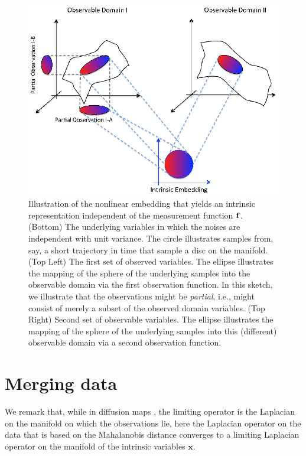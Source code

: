 \begin{figure}[t]
\centering
\includegraphics[width=5in]{fig1}
\caption[Illustration of the nonlinear embedding that yields an intrinsic representation independent of the measurement function]{Illustration of the nonlinear embedding that yields an intrinsic representation independent of the measurement function $\mathbf{f}$. (Bottom) The underlying variables in which the noises are independent with unit variance. The circle illustrates samples from, say, a short trajectory in time that sample a disc on the manifold. (Top Left) The first set of observed variables. The ellipse illustrates the mapping of the sphere of the underlying samples into the observable domain via the first observation function. In this sketch, we illustrate that the observations might be {\em partial}, i.e., might consist of merely a subset of the observed domain variables. (Top Right) Second set of observable variables. The ellipse illustrates the mapping of the sphere of the underlying samples into this (different) observable domain via a second observation function.
\label{fig:IntrinsicIllustration}}
\end{figure}


\section{Merging data}

We remark that, while in diffusion maps \cite{coifman2005geometric}, the limiting operator is the Laplacian on the manifold on which the observations lie,
here the Laplacian operator on the data that is based on the Mahalanobis distance converges to a limiting Laplacian operator on the
manifold of the intrinsic variables $\mathbf{x}$.

